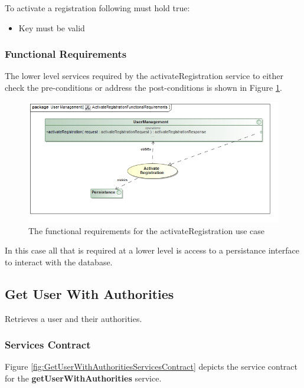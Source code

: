 To activate a registration following must hold true:
\begin{itemize}
	\item Key must be valid
\end{itemize}

\subsubsection{Functional Requirements}
The lower level services required by the activateRegistration service
to either check the pre-conditions or address the post-conditions is shown
in Figure \ref{fig:activateRegFR}.

\begin{figure}[H]
	\begin{center}
		\includegraphics[scale=0.5]{../Diagrams and Charts/Users/ActivateRegistrationFunctionalRequirements.jpg}
		\caption{The functional requirements for the activateRegistration use case}
		\label{fig:activateRegFR}
	\end{center}	
\end{figure}

In this case all that is required at a lower level is access to a persistance
interface to interact with the database.


\subsection{Get User With Authorities}
Retrieves a user and their authorities.

\subsubsection{Services Contract}
Figure \ref{fig:GetUserWithAuthoritiesServicesContract} depicts the service
contract for the \textbf{getUserWithAuthorities} service.


